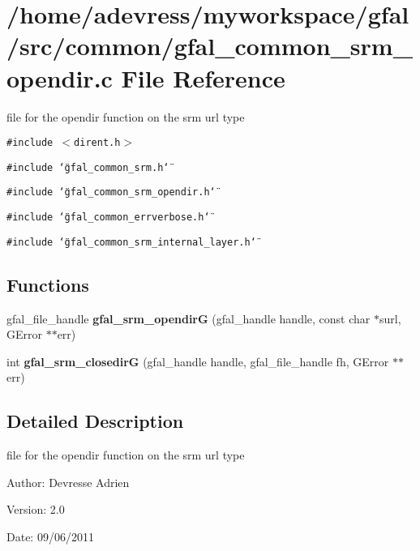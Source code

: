 \section{/home/adevress/myworkspace/gfal/src/common/gfal\_\-common\_\-srm\_\-opendir.c File Reference}
\label{gfal__common__srm__opendir_8c}
file for the opendir function on the srm url type 

{\tt \#include $<$dirent.h$>$}\par
{\tt \#include \char`\"{}gfal\_\-common\_\-srm.h\char`\"{}}\par
{\tt \#include \char`\"{}gfal\_\-common\_\-srm\_\-opendir.h\char`\"{}}\par
{\tt \#include \char`\"{}gfal\_\-common\_\-errverbose.h\char`\"{}}\par
{\tt \#include \char`\"{}gfal\_\-common\_\-srm\_\-internal\_\-layer.h\char`\"{}}\par
\subsection*{Functions}
\begin{CompactItemize}
\item 
gfal\_\-file\_\-handle \textbf{gfal\_\-srm\_\-opendir\-G} (gfal\_\-handle handle, const char $\ast$surl, GError $\ast$$\ast$err)\label{gfal__common__srm__opendir_8c_7084d6727c84907e67b1190ce7b15f94}

\item 
int \textbf{gfal\_\-srm\_\-closedir\-G} (gfal\_\-handle handle, gfal\_\-file\_\-handle fh, GError $\ast$$\ast$err)\label{gfal__common__srm__opendir_8c_951e2b6d3e746e60537d8b3475840bb0}

\end{CompactItemize}


\subsection{Detailed Description}
file for the opendir function on the srm url type 

\begin{Desc}
\item[Author:]Devresse Adrien \end{Desc}
\begin{Desc}
\item[Version:]2.0 \end{Desc}
\begin{Desc}
\item[Date:]09/06/2011 \end{Desc}
